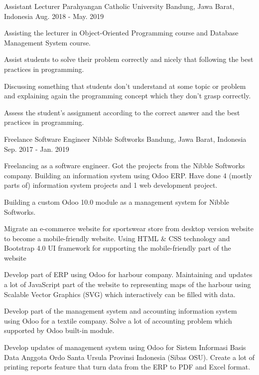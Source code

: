 \begin{cventries}
  \cventry
    {Assistant Lecturer} %
    {Parahyangan Catholic University} %
    {Bandung, Jawa Barat, Indonesia} %
    {Aug. 2018 - May. 2019} %
    {
      \begin{cvitems} %
        \item {Assisting the lecturer in Object-Oriented Programming course and Database Management System course.}
        \item {Assist students to solve their problem correctly and nicely that following the best practices in programming.}
        \item {Discussing something that students don't understand at some topic or problem and explaining again the programming concept which they don't grasp correctly.}
        \item {Assess the student's assignment according to the correct answer and the best practices in programming.}
      \end{cvitems}
    }

  \cventry
    {Freelance Software Engineer} %
    {Nibble Softworks} %
    {Bandung, Jawa Barat, Indonesia} %
    {Sep. 2017 - Jan. 2019} %
    {
      \begin{cvitems} %
        \item {Freelancing as a software engineer. Got the projects from the Nibble Softworks company. Building an information system using Odoo ERP. Have done 4 (mostly parts of) information system projects and 1 web development project.}
        \item {Building a custom Odoo 10.0 module as a management system for Nibble Softworks.}
        \item {Migrate an e-commerce website for sportswear store from desktop version website to become a mobile-friendly website. Using HTML \& CSS technology and Bootstrap 4.0 UI framework for supporting the mobile-friendly part of the website}
        \item {Develop part of ERP using Odoo for harbour company. Maintaining and updates a lot of JavaScript part of the website to representing maps of the harbour using Scalable Vector Graphics (SVG) which interactively can be filled with data.}
        \item {Develop part of the management system and accounting information system using Odoo for a textile company. Solve a lot of accounting problem which supported by Odoo built-in module.}
        \item {Develop updates of management system using Odoo for Sistem Informasi Basis Data Anggota Ordo Santa Ursula Provinsi Indonesia (Sibas OSU). Create a lot of printing reports feature that turn data from the ERP to PDF and Excel format.}
      \end{cvitems}
    }

\end{cventries}
